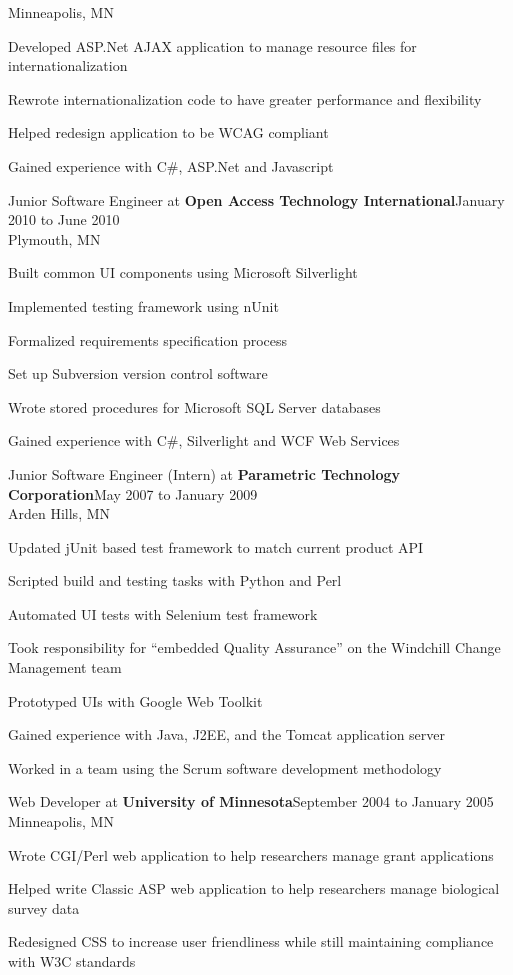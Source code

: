 \documentclass[letterpaper]{article}
\newenvironment{resume-list}
{\begin{itemize}
 \setlength{\itemsep}{0pt}
 \setlength{\parskip}{0pt}}
{\end{itemize}}
\begin{document}
Minneapolis, MN
\begin{resume-list}
\item Developed ASP.Net AJAX application to manage resource files for internationalization
\item Rewrote internationalization code to have greater performance and flexibility
\item Helped redesign application to be WCAG compliant
\item Gained experience with C\#, ASP.Net and Javascript
\end{resume-list}
\noindent Junior Software Engineer at {\bfseries Open Access Technology International}\dotfill January 2010 to June 2010\\
Plymouth, MN
\begin{resume-list}
\item Built common UI components using Microsoft Silverlight
\item Implemented testing framework using nUnit
\item Formalized requirements specification process
\item Set up Subversion version control software
\item Wrote stored procedures for Microsoft SQL Server databases
\item Gained experience with C\#, Silverlight and WCF Web Services
\end{resume-list}
\noindent Junior Software Engineer (Intern) at {\bfseries Parametric Technology Corporation}\dotfill May 2007 to January 2009\\
Arden Hills, MN
\begin{resume-list}
\item Updated jUnit based test framework to match current product API
\item Scripted build and testing tasks with Python and Perl
\item Automated UI tests with Selenium test framework
\item Took responsibility for ``embedded Quality Assurance'' on the Windchill Change Management team
\item Prototyped UIs with Google Web Toolkit
\item Gained experience with Java, J2EE, and the Tomcat application server
\item Worked in a team using the Scrum software development methodology
\end{resume-list}
\noindent Web Developer at {\bfseries University of Minnesota}\dotfill September 2004 to January 2005\\
Minneapolis, MN
\begin{resume-list}
\item Wrote CGI/Perl web application to help researchers manage grant applications
\item Helped write Classic ASP web application to help researchers manage biological survey data
\item Redesigned CSS to increase user friendliness while still maintaining compliance with W3C standards
\end{resume-list}
\end{document}
